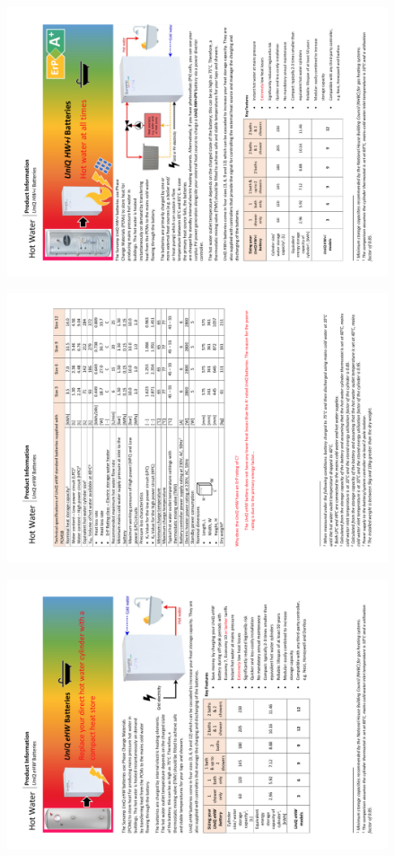 \begin{figure}
	\centering
	\includegraphics[height=0.48\textheight]{Appendices/2_PIS_HW+i_01.png}
\end{figure}


\newpage
\begin{figure}
	\centering
	\includegraphics[height=0.48\textheight]{Appendices/3_PIS_eHW_02.png}
\end{figure}

\begin{figure}
	\centering
	\includegraphics[height=0.48\textheight]{Appendices/3_PIS_eHW_01.png}
\end{figure}



